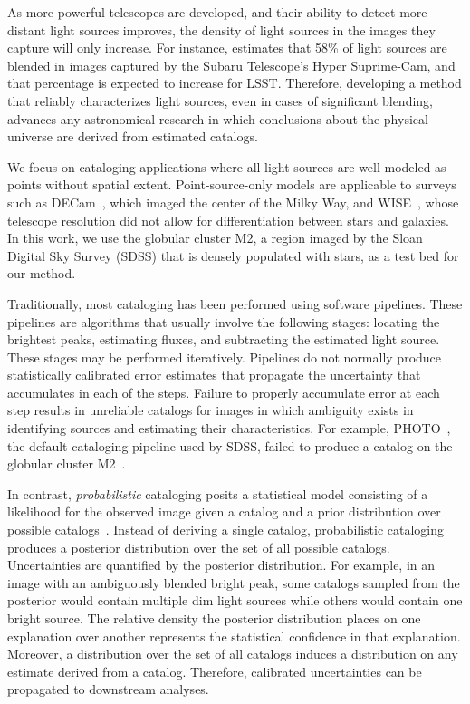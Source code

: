 As more powerful telescopes are developed, and their ability to detect more distant light sources improves, the density of light sources in the images they capture will only increase. 
For instance, \cite{bosch2018hyper} estimates that 58\% of light sources are blended in images captured by the Subaru Telescope’s Hyper Suprime-Cam, and that percentage is expected to increase for LSST. 
Therefore, developing a method that reliably characterizes light sources, even in cases of significant blending, 
advances any astronomical research in which conclusions about the physical universe are derived from estimated catalogs. 

We focus on cataloging applications where all light sources are well modeled as points without spatial extent. 
Point-source-only models are applicable to surveys such as DECam~\citep{Schlafly_2018_DECam}, which imaged the center of the  Milky Way, and WISE~\citep{Wright_2010_WISESurvey}, whose telescope resolution did not allow for differentiation between stars and galaxies.
In this work, we use the globular cluster M2, a region imaged by the Sloan Digital Sky Survey (SDSS) that is densely populated with stars, as a test bed for our method. 

\bigbreak


Traditionally, most cataloging has been performed using software pipelines.
These pipelines are algorithms that usually involve the following stages: locating the brightest peaks, estimating fluxes, and subtracting the estimated light source.
These stages may be performed iteratively.
Pipelines do not normally produce statistically calibrated error estimates that propagate 
the uncertainty that accumulates in each of the steps. 
Failure to properly accumulate error at each step results in unreliable catalogs for images in which ambiguity exists in identifying sources and estimating their characteristics.
For example, PHOTO~\citep{lupton2001sdss}, the default cataloging pipeline used by SDSS, failed to produce a catalog on the globular cluster M2~\citep{Portillo_2017}. 

In contrast, {\itshape probabilistic} cataloging posits a statistical model consisting of a likelihood for the observed image given a catalog and a prior distribution over possible catalogs~\citep{Portillo_2017, Brewer_2013, Feder_2019}. 
Instead of deriving a single catalog, probabilistic cataloging produces a posterior distribution over the set of all possible catalogs. 
Uncertainties are quantified by the posterior distribution. 
For example, in an image with an ambiguously blended bright peak, some catalogs sampled from the posterior would contain multiple dim light sources while others would contain one bright source. 
The relative density the posterior distribution places on one explanation over another represents the statistical confidence in that explanation. 
Moreover, a distribution over the set of all catalogs induces a distribution on any estimate derived from a catalog. Therefore, calibrated uncertainties can be propagated to downstream analyses.  

